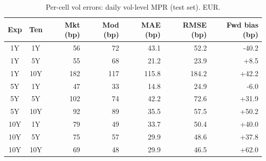 \begin{table}[H]
\centering
\caption{Per-cell vol errors: daily vol-level MPR (test set). EUR.}
\label{tab:daily_vol_mpr_per_cell_test}
\small
\begin{tabular}{@{}ccrrrrr@{}}
\toprule
\textbf{Exp} & \textbf{Ten} & \textbf{Mkt (bp)} & \textbf{Mod (bp)} & \textbf{MAE (bp)} & \textbf{RMSE (bp)} & \textbf{Fwd bias (bp)} \\
\midrule
  1Y & 1Y & 56 & 72 & 43.1 & 52.2 & -40.2 \\
  1Y & 5Y & 55 & 68 & 21.2 & 23.9 & +8.5 \\
  1Y & 10Y & 182 & 117 & 115.8 & 184.2 & +42.2 \\
  \midrule
  5Y & 1Y & 47 & 33 & 14.8 & 24.9 & -6.0 \\
  5Y & 5Y & 102 & 74 & 42.2 & 72.6 & +31.9 \\
  5Y & 10Y & 92 & 89 & 35.5 & 57.5 & +50.2 \\
  \midrule
  10Y & 1Y & 79 & 49 & 33.7 & 50.4 & +40.0 \\
  10Y & 5Y & 75 & 57 & 29.9 & 48.6 & +37.8 \\
  10Y & 10Y & 69 & 48 & 29.9 & 46.5 & +62.0 \\
\bottomrule
\end{tabular}
\end{table}